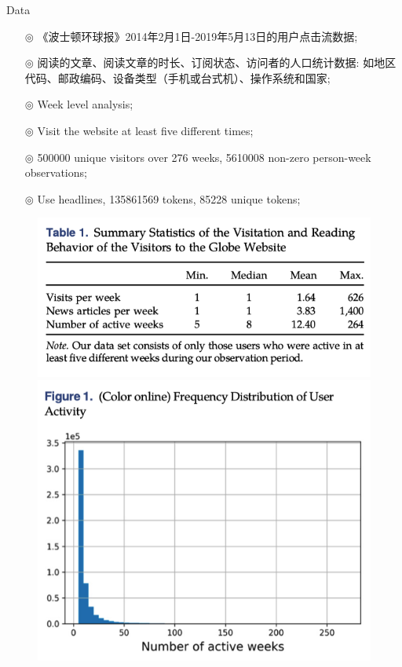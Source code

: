 \documentclass{beamer}
\begin{document}
\begin{frame}[allowframebreaks]{Data}
	\begin{itemize}
		\item[$\circledcirc$] 《波士顿环球报》2014年2月1日-2019年5月13日的用户点击流数据;
		\item[$\circledcirc$] 阅读的文章、阅读文章的时长、订阅状态、访问者的人口统计数据: 如地区代码、邮政编码、设备类型（手机或台式机）、操作系统和国家;
		\item[$\circledcirc$] Week level analysis;
		\item[$\circledcirc$] Visit the website at least five different times;
		\item[$\circledcirc$] 500000 unique visitors over 276 weeks, 5610008 non-zero person-week observations;
		\item[$\circledcirc$] Use headlines, 135861569 tokens, 85228 unique tokens;
	\end{itemize}
	\begin{figure}[htpb]
		\centering
		\begin{minipage}[t]{0.45\textwidth}
			\centering
			\includegraphics[width=\textwidth]{pic/behavior-data.png}
		\end{minipage}
		\begin{minipage}[t]{0.45\textwidth}
			\centering
			\includegraphics[width=\textwidth]{pic/freq-week.png}
		\end{minipage}
	\end{figure}


\end{frame}
\end{document}
